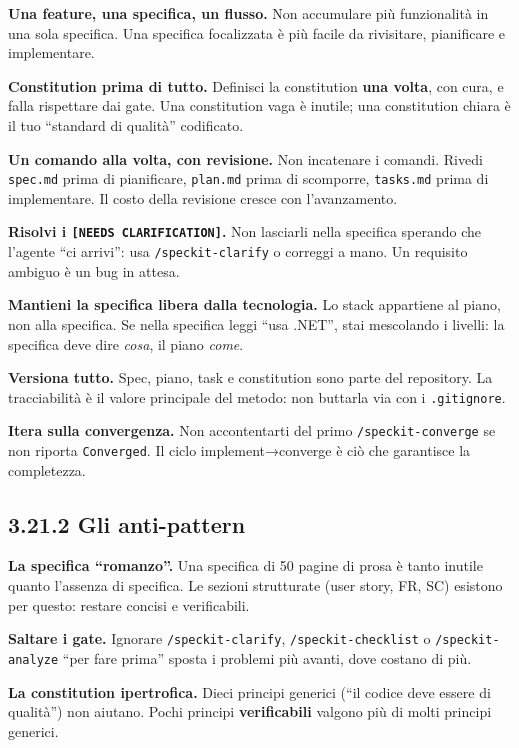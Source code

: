 \documentclass[
  italian,
  10pt,
]{book}
\begin{document}
\textbf{Una feature, una specifica, un flusso.} Non accumulare più
funzionalità in una sola specifica. Una specifica focalizzata è più
facile da rivisitare, pianificare e implementare.

\textbf{Constitution prima di tutto.} Definisci la constitution
\textbf{una volta}, con cura, e falla rispettare dai gate. Una
constitution vaga è inutile; una constitution chiara è il tuo ``standard
di qualità'' codificato.

\textbf{Un comando alla volta, con revisione.} Non incatenare i comandi.
Rivedi \texttt{spec.md} prima di pianificare, \texttt{plan.md} prima di
scomporre, \texttt{tasks.md} prima di implementare. Il costo della
revisione cresce con l'avanzamento.

\textbf{Risolvi i \texttt{{[}NEEDS\ CLARIFICATION{]}}.} Non lasciarli
nella specifica sperando che l'agente ``ci arrivi'': usa
\texttt{/speckit-clarify} o correggi a mano. Un requisito ambiguo è un
bug in attesa.

\textbf{Mantieni la specifica libera dalla tecnologia.} Lo stack
appartiene al piano, non alla specifica. Se nella specifica leggi ``usa
.NET'', stai mescolando i livelli: la specifica deve dire \emph{cosa},
il piano \emph{come}.

\textbf{Versiona tutto.} Spec, piano, task e constitution sono parte del
repository. La tracciabilità è il valore principale del metodo: non
buttarla via con i \texttt{.gitignore}.

\textbf{Itera sulla convergenza.} Non accontentarti del primo
\texttt{/speckit-converge} se non riporta \texttt{Converged}. Il ciclo
implement→converge è ciò che garantisce la completezza.

\subsection{3.21.2 Gli anti-pattern}\label{gli-anti-pattern}

\textbf{La specifica ``romanzo''.} Una specifica di 50 pagine di prosa è
tanto inutile quanto l'assenza di specifica. Le sezioni strutturate
(user story, FR, SC) esistono per questo: restare concisi e
verificabili.

\textbf{Saltare i gate.} Ignorare \texttt{/speckit-clarify},
\texttt{/speckit-checklist} o \texttt{/speckit-analyze} ``per fare
prima'' sposta i problemi più avanti, dove costano di più.

\textbf{La constitution ipertrofica.} Dieci principi generici (``il
codice deve essere di qualità'') non aiutano. Pochi principi
\textbf{verificabili} valgono più di molti principi generici.
\end{document}
